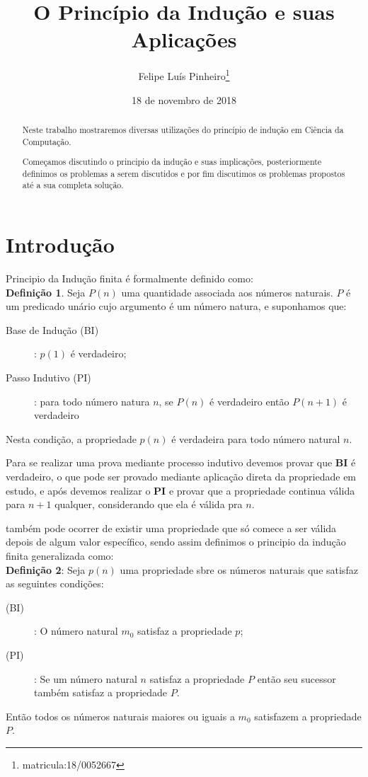 \documentclass[a4paper, 10pt]{article}
\title{\LARGE \bf O Princípio da Indução e suas Aplicações }
\author{Felipe Luís Pinheiro\footnote{matricula:18/0052667}}
\date{ 18 de novembro de 2018}
\begin{document}
\maketitle

\begin{abstract}

Neste trabalho mostraremos diversas utilizações do princípio de indução em Ciência da Computação.

Começamos discutindo o principio da indução e suas implicações, posteriormente definimos os problemas a serem discutidos e por fim discutimos os problemas propostos até a sua completa solução.

\end{abstract}

\section{Introdução}

Principio da Indução finita  é formalmente definido como:\\
\textbf{Definição 1}. Seja $P(n)$ uma quantidade associada aos números naturais. $P$ é um predicado unário cujo argumento é um número natura, e suponhamos que:
\begin{description}
	\item[Base de Indução (BI)]:  $p(1)$ é verdadeiro;
	\item[Passo Indutivo (PI)]:  para todo número natura $n$, se $P(n)$ é verdadeiro então $P(n+1)$ é verdadeiro
\end{description}
Nesta condição, a propriedade $p(n)$ é verdadeira para todo número natural $n$.

Para se realizar uma prova mediante processo indutivo devemos provar que \textbf{BI} é verdadeiro, o que pode ser provado mediante aplicação direta da propriedade em estudo, e após devemos realizar o \textbf{PI} e provar que a propriedade continua válida para $n+1$ qualquer, considerando que ela é válida pra $n$.

também pode ocorrer de existir uma propriedade que só comece a ser válida depois de algum valor específico, sendo assim definimos o principio da indução finita generalizada  como:\\
\textbf{Definição 2}: Seja $p(n)$ uma propriedade sbre os números naturais que satisfaz as seguintes condições: 
\begin{description}
	\item[(BI)]: O número natural $m_0$ satisfaz a propriedade $p$;
	\item[(PI)]: Se um número natural $n$ satisfaz a propriedade $P$ então seu sucessor também satisfaz a propriedade $P$.
\end{description}
Então todos os números naturais maiores ou iguais a $m_0$ satisfazem a propriedade $P$.
\end{document}
